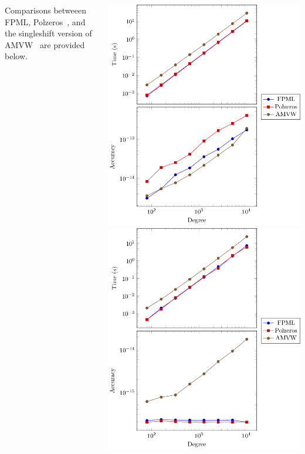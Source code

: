 \documentclass[20 pt, a0paper, portrait]{tikzposter}
\begin{document}
 \begin{columns}
	{
	Comparisons betweeen FPML, Polzeros~\cite{Bini1996}, and the singleshift version of AMVW~\cite{Aurentz2015} are provided below.
	\begin{tikzfigure}
	\centering
	\includegraphics[scale=0.60]{../tests/figures/rand_poly.png}
	\includegraphics[scale=0.60]{../tests/figures/unity.png}
	\end{tikzfigure}
	}
	
	{
		
		
	}
 \end{columns}
 
\end{document}

